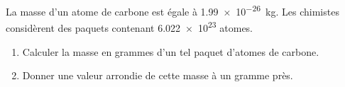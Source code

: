 
\begin{exercice}\label{exo2smath-0209}

    La masse d’un atome de carbone est égale à \SI[parse-numbers=true]{1.99e-26 }{\kilo\gram}. Les chimistes considèrent des paquets contenant \num[parse-numbers=true]{6.022e23} atomes. 
    \begin{enumerate}
        \item
    Calculer la masse en grammes d’un tel paquet d’atomes de carbone. 
\item
     Donner une valeur arrondie de cette masse à un gramme près.
    \end{enumerate}

\end{exercice}
